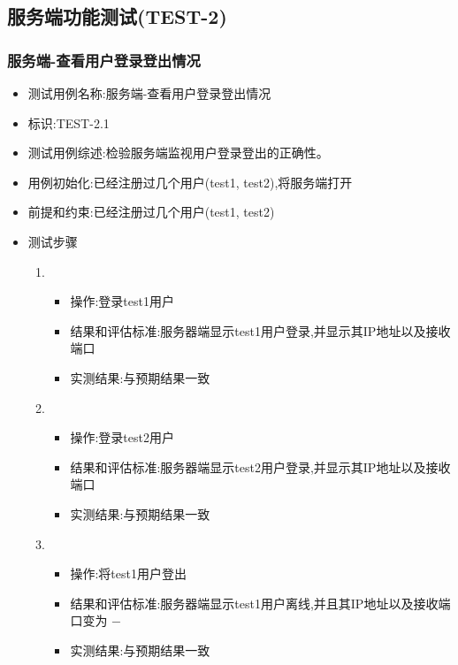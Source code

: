 \documentclass{article}
\begin{document}
\subsection{服务端功能测试(TEST-2)}

\subsubsection{服务端-查看用户登录登出情况}
\begin{itemize}
\item 测试用例名称:服务端-查看用户登录登出情况
\item 标识:TEST-2.1
\item 测试用例综述:检验服务端监视用户登录登出的正确性。
\item 用例初始化:已经注册过几个用户(test1, test2),将服务端打开
\item 前提和约束:已经注册过几个用户(test1, test2)
\item 测试步骤
  \begin{enumerate}
  \item
    \begin{itemize}
    \item 操作:登录test1用户
    \item 结果和评估标准:服务器端显示test1用户登录,并显示其IP地址以及接收端口
    \item 实测结果:与预期结果一致
    \end{itemize}
  \item
    \begin{itemize}
    \item 操作:登录test2用户
    \item 结果和评估标准:服务器端显示test2用户登录,并显示其IP地址以及接收端口
    \item 实测结果:与预期结果一致
    \end{itemize}
  \item
    \begin{itemize}
    \item 操作:将test1用户登出
    \item 结果和评估标准:服务器端显示test1用户离线,并且其IP地址以及接收端口变为 $-$
    \item 实测结果:与预期结果一致
    \end{itemize}


\end{enumerate}
\end{itemize}
\end{document}
